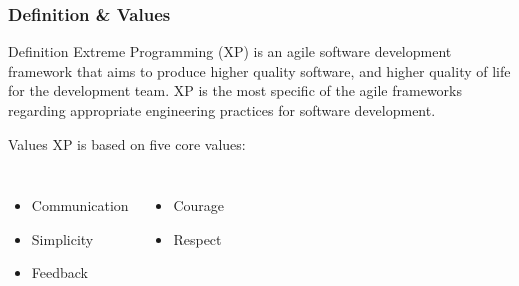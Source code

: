 \begin{frame}
    \frametitle{Definition \& Values}
    \begin{block}{Definition}
        Extreme Programming (XP) is an agile software development framework that aims to produce higher quality software, and higher quality of life for the development team. XP is the most specific of the agile frameworks regarding appropriate engineering practices for software development.
    \end{block}\pause
    \begin{exampleblock}{Values}
        XP is based on five core values:
        \begin{columns}
            \begin{itemize}
                \item Communication\pause
                \item Simplicity\pause
                \item Feedback\pause
            \end{itemize}
            \begin{itemize}
                \item Courage\pause
                \item Respect\pause
            \end{itemize}
        \end{columns}
    \end{exampleblock}
\end{frame}